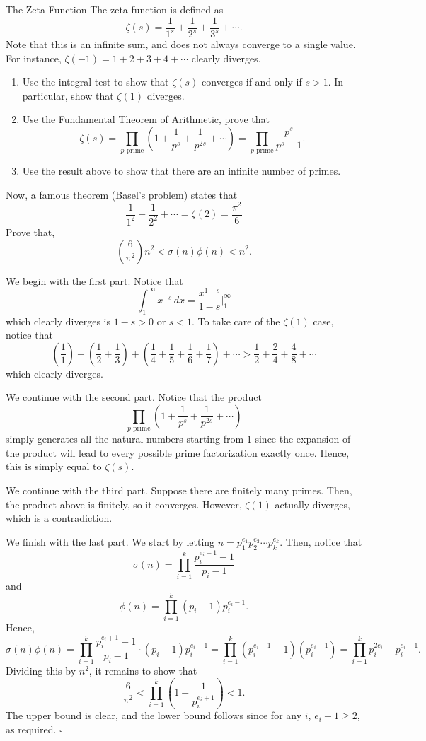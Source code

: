 \documentclass{article}
\begin{document}
\begin{problem}[3.3.2]{The Zeta Function}
The zeta function is defined as \[\zeta(s) = \dfrac{1}{1^s}+\dfrac{1}{2^s}+\dfrac{1}{3^s} + \cdots.\] Note that this is an infinite sum, and does not always converge to a single value. For instance, $\zeta(-1) = 1 + 2 + 3 + 4 + \cdots$ clearly diverges.
\begin{enumerate}
\item Use the integral test to show that $\zeta(s)$ converges if and only if $s > 1$. In particular, show that $\zeta(1)$ diverges.
\item Use the Fundamental Theorem of Arithmetic, prove that \[\zeta(s) = \prod_{p\text{ prime}} \left(1 + \dfrac{1}{p^s} + \dfrac{1}{p^{2s}} + \cdots\right) = \prod_{p\text{ prime}} \dfrac{p^s}{p^s-1}.\]
\item Use the result above to show that there are an infinite number of primes.
\end{enumerate}
Now, a famous theorem (Basel's problem) states that \[\dfrac{1}{1^2}+\dfrac{1}{2^2}+\cdots = \zeta(2) = \dfrac{\pi^2}{6}\] Prove that, \[\left(\dfrac{6}{\pi^2}\right)n^2 < \sigma(n)\phi(n) < n^2.\]
\end{problem}

We begin with the first part. Notice that \[\int_1^{\infty} x^{-s} \, dx= \dfrac{x^{1-s}}{1-s} \Big|_1^{\infty}\] which clearly diverges is $1-s > 0$ or $s < 1$. To take care of the $\zeta(1)$ case, notice that \[\left(\dfrac{1}{1}\right)+\left(\dfrac{1}{2}+\dfrac{1}{3}\right)+\left(\dfrac{1}{4}+\dfrac{1}{5}+\dfrac{1}{6}+\dfrac{1}{7}\right) +\cdots > \dfrac{1}{2}+\dfrac{2}{4} + \dfrac{4}{8}+\cdots\] which clearly diverges.

We continue with the second part. Notice that the product \[\prod_{p\text{ prime}} \left(1 + \dfrac{1}{p^s} + \dfrac{1}{p^{2s}} + \cdots\right)\] simply generates all the natural numbers starting from $1$ since the expansion of the product will lead to every possible prime factorization exactly once. Hence, this is simply equal to $\zeta(s)$.

We continue with the third part. Suppose there are finitely many primes. Then, the product above is finitely, so it converges. However, $\zeta(1)$ actually diverges, which is a contradiction.

We finish with the last part. We start by letting $n = p_1^{e_1}p_2^{e_2}\cdots p_k^{e_k}$. Then, notice that \[\sigma(n) = \prod_{i=1}^k \dfrac{p_i^{e_i+1}-1}{p_i-1}\] and \[\phi(n) = \prod_{i=1}^k (p_i-1)p_i^{e_i-1}.\] Hence, \[\sigma(n)\phi(n) = \prod_{i=1}^k \dfrac{p_i^{e_i+1}-1}{p_i-1}\cdot (p_i-1)p_i^{e_i-1} = \prod_{i=1}^k \left(p_i^{e_i+1}-1\right)\left(p_i^{e_i-1}\right) = \prod_{i=1}^k p_i^{2e_i}-p_i^{e_i-1}.\] Dividing this by $n^2$, it remains to show that \[\dfrac{6}{\pi^2} < \prod_{i=1}^k \left(1-\dfrac{1}{p_i^{e_i+1}}\right) < 1.\] The upper bound is clear, and the lower bound follows since for any $i$, $e_i+1 \ge 2$, as required. $\square$
\end{document}
